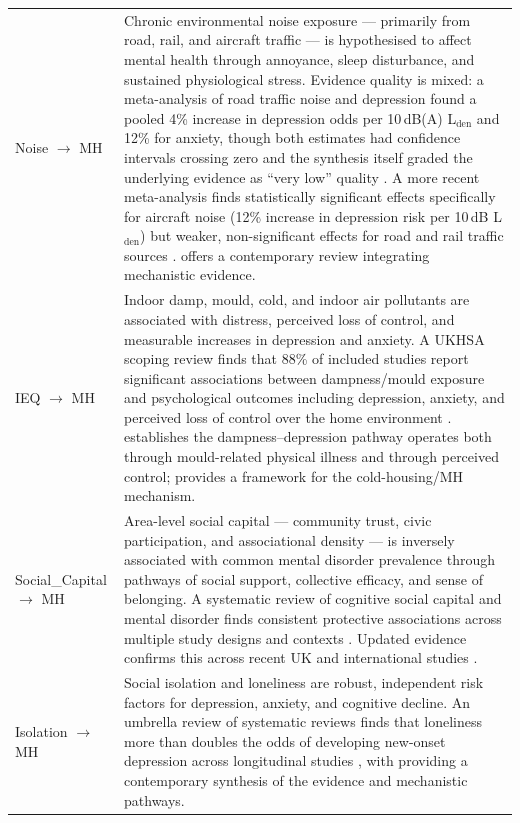 \begin{longtable}{@{}p{3.5cm}p{11.5cm}@{}}
Noise $\to$ MH & Chronic environmental noise exposure — primarily from road, rail, and aircraft traffic — is hypothesised to affect mental health through annoyance, sleep disturbance, and sustained physiological stress. Evidence quality is mixed: a meta-analysis of road traffic noise and depression found a pooled 4\% increase in depression odds per 10\,dB(A) L$_\text{den}$ and 12\% for anxiety, though both estimates had confidence intervals crossing zero and the synthesis itself graded the underlying evidence as ``very low'' quality \citep{dzhambov_road_2019}. A more recent meta-analysis finds statistically significant effects specifically for aircraft noise (12\% increase in depression risk per 10\,dB L$_\text{den}$) but weaker, non-significant effects for road and rail traffic sources \citep{hegewald_traffic_2020}. \citet{hahad_noise_2024} offers a contemporary review integrating mechanistic evidence. \\
\addlinespace
IEQ $\to$ MH & Indoor damp, mould, cold, and indoor air pollutants are associated with distress, perceived loss of control, and measurable increases in depression and anxiety. A UKHSA scoping review finds that 88\% of included studies report significant associations between dampness/mould exposure and psychological outcomes including depression, anxiety, and perceived loss of control over the home environment \citep{brooks_psychological_2025}. \citet{shenassa_dampness_2007} establishes the dampness–depression pathway operates both through mould-related physical illness and through perceived control; \citet{liddell_living_2015} provides a framework for the cold-housing/MH mechanism. \\
\addlinespace
Social\_Capital $\to$ MH & Area-level social capital — community trust, civic participation, and associational density — is inversely associated with common mental disorder prevalence through pathways of social support, collective efficacy, and sense of belonging. A systematic review of cognitive social capital and mental disorder finds consistent protective associations across multiple study designs and contexts \citep{de_silva_social_2005}. Updated evidence confirms this across recent UK and international studies \citep{magro-montanes_relationship_2024, rodgers_social_2019}. \\
\addlinespace
Isolation $\to$ MH & Social isolation and loneliness are robust, independent risk factors for depression, anxiety, and cognitive decline. An umbrella review of systematic reviews finds that loneliness more than doubles the odds of developing new-onset depression across longitudinal studies \citep{leigh-hunt_overview_2017}, with \citet{holtlunstad_social_2024} providing a contemporary synthesis of the evidence and mechanistic pathways. \\

\end{longtable}
